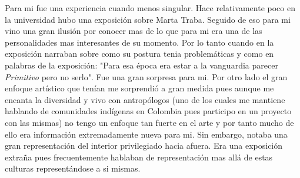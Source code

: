 \documentclass{assignmeownt}
\begin{document}
    \maketitle
    \thispagestyle{firststyle}
    
    Para mi fue una experiencia cuando menos singular. Hace relativamente poco en la universidad hubo una exposición sobre Marta Traba. Seguido de eso para mi vino una gran ilusión por conocer mas de lo que para mi era una de las personalidades mas interesantes de su momento. Por lo tanto cuando en la exposición narraban sobre como su postura tenia problemáticas y como en palabras de la exposición: "Para esa época era estar a la vanguardia parecer \textit{Primitivo} pero no serlo". Fue una gran sorpresa para mi. Por otro lado el gran enfoque artístico que tenían me sorprendió a gran medida pues aunque me encanta la diversidad y vivo con antropólogos (uno de los cuales me mantiene hablando de comunidades indígenas en Colombia pues participo en un proyecto con las mismas) no tengo un enfoque tan fuerte en el arte y por tanto mucho de ello era información extremadamente nueva para mi. Sin embargo, notaba una gran representación del interior privilegiado hacia afuera. Era una exposición extraña pues frecuentemente hablaban de representación mas allá de estas culturas representándose a si mismas.
\end{document}

